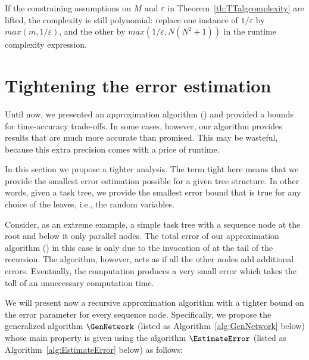 \documentclass[review]{elsarticle}
\DeclareMathOperator{\Sequence}{Sequence}
\begin{document}
If the constraining assumptions on $M$ and $\varepsilon$ in Theorem~\ref{th:TTalgcomplexity} are lifted, the complexity is still polynomial:
replace one instance of $1/\varepsilon$ by $max(m,1/\varepsilon)$, and the other by $max(1/\varepsilon,N (N^2+1))$
in the runtime complexity expression.

\section{Tightening the error estimation}\label{Chap:Bound}

Until now, we presented an approximation algorithm (\Network) and provided a bounds for time-accuracy trade-offs. In some cases, however, our algorithm provides results that are much more accurate than promised. This may be wasteful, because this extra precision comes with a price of runtime.

In this section we propose a tighter analysis. The term tight here means that we provide the smallest error estimation possible for a given tree structure. In other words, given a task tree, we provide the smallest error bound that is true for any choice of the leaves, i.e., the random variables.


Consider, as an extreme example, a simple task tree with a sequence node at the root and below it only parallel nodes. The total error of our approximation algorithm (\Network) in this case is only due to the invocation of \Sequence at the tail of the recursion. The \Network algorithm, however,  acts as if all the other nodes add additional errors. Eventually, the \Sequence
computation produces a very small error which takes the toll of an unnecessary computation time. 

We will present now a recursive approximation algorithm with a tighter bound on the error parameter for every sequence node. Specifically, we propose the generalized algorithm $\GenNetwork$ (listed as Algorithm~\ref{alg:GenNetwork} below) whose main property is given using the algorithm $\EstimateError$ (listed as Algorithm~\ref{alg:EstimateError} below) as follows:

\end{document}
